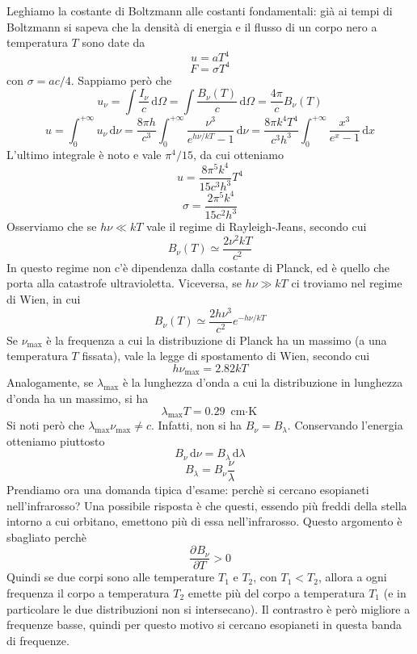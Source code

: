 \documentclass[a4paper,11pt]{article}
\renewcommand{\d}{\mathrm{d}} %
\newcommand{\pder}[3][]{\frac{\partial ^{#1}#2}{\partial {#3}^{#1}}} %
\renewcommand{\d}{\,\mathrm{d}}
\theoremstyle{theorem}
\theoremstyle{definition}
\begin{document}
\begin{itemize}
		\begin{figure}[h]
			\centering
		\end{figure}
		\noindent Leghiamo la costante di Boltzmann alle costanti fondamentali: già ai tempi di Boltzmann si sapeva che la densità di energia e il flusso di un corpo nero a temperatura $T$ sono date da
		\[u=aT^4\]
		\[F=\sigma T^4\]
		con $\sigma=ac/4$. Sappiamo però che
		\[u_\nu=\int\frac{I_\nu}{c}\d\Omega=\int\frac{B_\nu(T)}{c}\d\Omega=\frac{4\pi}{c}B_\nu(T)\]
		\[u=\int_{0}^{+\infty}u_\nu\d\nu=\frac{8\pi h}{c^3}\int_{0}^{+\infty}\frac{\nu^3}{e^{h\nu/kT}-1}\d\nu=\frac{8\pi k^4T^4}{c^3h^3}\int_{0}^{+\infty}\frac{x^3}{e^x-1}\d x\]
		L'ultimo integrale è noto e vale $\pi^4/15$, da cui otteniamo
		\[u=\frac{8\pi^5k^4}{15c^3h^3}T^4\]
		\[\sigma=\frac{2\pi^5k^4}{15c^2h^3}\]
		Osserviamo che se $h\nu\ll kT$ vale il regime di Rayleigh-Jeans, secondo cui
		\[B_\nu(T)\simeq\frac{2\nu^2kT}{c^2}\]
		In questo regime non c'è dipendenza dalla costante di Planck, ed è quello che porta alla catastrofe ultravioletta. Viceversa, se $h\nu\gg kT$ ci troviamo nel regime di Wien, in cui
		\[B_\nu(T)\simeq\frac{2h\nu^3}{c^2}e^{-h\nu/kT}\]
		Se $\nu_{\textrm{max}}$ è la frequenza a cui la distribuzione di Planck ha un massimo (a una temperatura $T$ fissata), vale la legge di spostamento di Wien, secondo cui
		\[h\nu_{\textrm{max}}=2.82kT\]
		Analogamente, se $\lambda_{\textrm{max}}$ è la lunghezza d'onda a cui la distribuzione in lunghezza d'onda ha un massimo, si ha
		\[\lambda_{\textrm{max}}T=0.29\textrm{ cm$\cdot$K}\]
		Si noti però che $\lambda_{\max}\nu_{\max}\neq c$. Infatti, non si ha $B_{\nu}=B_{\lambda}$. Conservando l'energia otteniamo piuttosto
		\[B_\nu\d\nu=B_\lambda\d\lambda\]
		\[B_\lambda=B_\nu\frac{\nu}{\lambda}\]
		Prendiamo ora una domanda tipica d'esame: perchè si cercano esopianeti nell'infrarosso? Una possibile risposta è che questi, essendo più freddi della stella intorno a cui orbitano, emettono più di essa nell'infrarosso. Questo argomento è sbagliato perchè
		\[\pder{B_\nu}{T}>0\]
		Quindi se due corpi sono alle temperature $T_1$ e $T_2$, con $T_1<T_2$, allora a ogni frequenza il corpo a temperatura $T_2$ emette più del corpo a temperatura $T_1$ (e in particolare le due distribuzioni non si intersecano). Il contrastro è però migliore a frequenze basse, quindi per questo motivo si cercano esopianeti in questa banda di frequenze.

\end{itemize}
\end{document}
